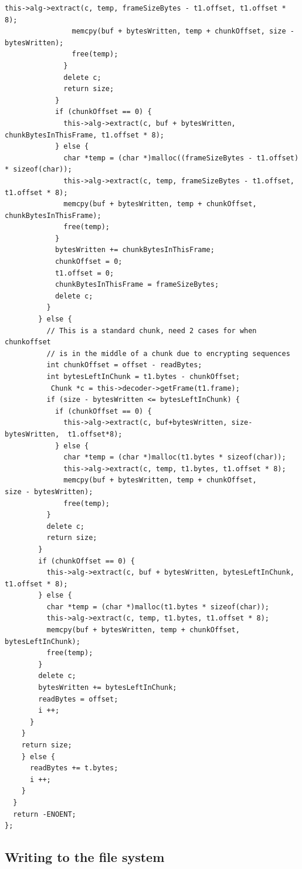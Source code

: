 \documentclass[paper=a4, fontsize=11pt,twoside]{scrartcl}
\numberwithin{table}{section}
\numberwithin{figure}{section}
\numberwithin{algorithm}{section}
\begin{document}
\begin{lstlisting}[caption={\texttt{FUSE} read function call implementation.}, frame=single, label=readfs,showstringspaces=false,upquote=true]
                this->alg->extract(c, temp, frameSizeBytes - t1.offset, t1.offset * 8);
                memcpy(buf + bytesWritten, temp + chunkOffset, size - bytesWritten);
                free(temp);
              }
              delete c;
              return size;
            }
            if (chunkOffset == 0) {
              this->alg->extract(c, buf + bytesWritten, chunkBytesInThisFrame, t1.offset * 8);
            } else {
              char *temp = (char *)malloc((frameSizeBytes - t1.offset) * sizeof(char));
              this->alg->extract(c, temp, frameSizeBytes - t1.offset, t1.offset * 8);
              memcpy(buf + bytesWritten, temp + chunkOffset, chunkBytesInThisFrame);
              free(temp);
            }
            bytesWritten += chunkBytesInThisFrame;
            chunkOffset = 0;
            t1.offset = 0;
            chunkBytesInThisFrame = frameSizeBytes;
            delete c;
          }
        } else {
          // This is a standard chunk, need 2 cases for when chunkoffset
          // is in the middle of a chunk due to encrypting sequences
          int chunkOffset = offset - readBytes;
          int bytesLeftInChunk = t1.bytes - chunkOffset;
           Chunk *c = this->decoder->getFrame(t1.frame);
          if (size - bytesWritten <= bytesLeftInChunk) {
            if (chunkOffset == 0) {
              this->alg->extract(c, buf+bytesWritten, size-bytesWritten,  t1.offset*8);
            } else {
              char *temp = (char *)malloc(t1.bytes * sizeof(char));
              this->alg->extract(c, temp, t1.bytes, t1.offset * 8);
              memcpy(buf + bytesWritten, temp + chunkOffset,            size - bytesWritten);
              free(temp);
          }
          delete c;
          return size;
        }
        if (chunkOffset == 0) {
          this->alg->extract(c, buf + bytesWritten, bytesLeftInChunk, t1.offset * 8);
        } else {
          char *temp = (char *)malloc(t1.bytes * sizeof(char));
          this->alg->extract(c, temp, t1.bytes, t1.offset * 8);
          memcpy(buf + bytesWritten, temp + chunkOffset, bytesLeftInChunk);
          free(temp);
        }
        delete c;
        bytesWritten += bytesLeftInChunk;
        readBytes = offset;
        i ++;
      }
    }
    return size;
    } else {
      readBytes += t.bytes;
      i ++;
    }
  }
  return -ENOENT;
};
\end{lstlisting}

\subsection{Writing to the file system}
\label{app:codewrite}
\end{document}

